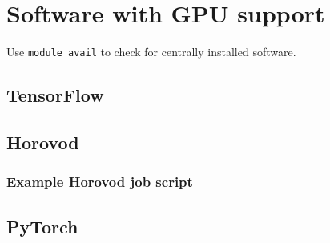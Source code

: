 \section{Software with GPU support}
\label{sec:gpu_ugent_software}

Use \lstinline|module avail| to check for centrally installed software.





\subsection{TensorFlow}
\label{sec:gpu_ugent_software_tensorflow}






\subsection{Horovod}
\label{sec:gpu_ugent_software_horovod}

\subsubsection{Example Horovod job script}
\label{sec:gpu_ugent_software_horovod_example_job_script}






\subsection{PyTorch}
\label{sec:gpu_ugent_software_pytorch}
